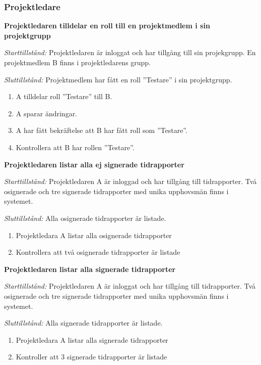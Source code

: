 \documentclass[a4paper]{article}
\begin{document}
\subsubsection{Projektledare}
\begin{FT}

\item %
\textbf{Projektledaren tilldelar en roll till en projektmedlem i sin projektgrupp}

\emph{Starttillstånd:} Projektledaren är inloggat och har tillgång till sin projekgrupp. En projektmedlem B finns i projektledarens grupp.

\emph{Sluttillstånd:} Projektmedlem har fått en roll ”Testare” i sin projektgrupp.

\begin{enumerate}
\item A tilldelar roll ”Testare” till B.
\item A sparar ändringar.
\item A har fått bekräftelse att B har fått roll som ”Testare”.
\item Kontrollera att B har rollen ''Testare''.
\end{enumerate}

\item %
\textbf{Projektledaren listar alla ej signerade tidrapporter}

\emph{Starttillstånd:} Projektledaren A är inloggad och har tillgång till tidrapporter. Två osignerade och tre signerade tidrapporter med unika upphovsmän finns i systemet.

\emph{Sluttillstånd:} Alla osignerade tidrapporter är listade.                          

\begin{enumerate}
\item Projektledara A listar alla osignerade tidrapporter
\item Kontrollera att två osignerade tidrapporter är listade
\end{enumerate}

\item %
\textbf{Projektledaren listar alla signerade tidrapporter}

\emph{Starttillstånd:} Projektledaren A är inloggat och har tillgång till tidrapporter. Två osignerade och tre signerade tidrapporter med unika upphovsmän finns i systemet.

\emph{Sluttillstånd:} Alla signerade tidrapporter är listade.

\begin{enumerate}
\item Projektledara A listar alla signerade tidrapporter
\item Kontroller att 3 signerade tidrapporter är listade
\end{enumerate}


\end{FT}
\end{document}

